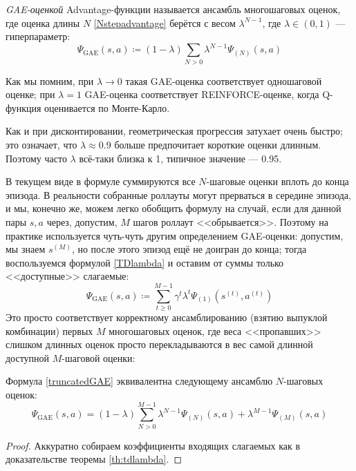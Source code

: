 \begin{definition}
\emph{GAE-оценкой} Advantage-функции называется ансамбль многошаговых оценок, где оценка длины $N$ \eqref{Nstepadvantage} берётся с весом $\lambda^{N-1}$, где $\lambda \in (0, 1)$ --- гиперпараметр:
\begin{equation}\label{GAEadest}
\Psi_{\mathrm{GAE}}(s, a) \coloneqq (1 - \lambda) \sum_{N > 0} \lambda^{N-1} \Psi_{(N)}(s, a)
\end{equation}
\end{definition}

Как мы помним, при $\lambda \to 0$ такая GAE-оценка соответствует одношаговой оценке; при $\lambda = 1$ GAE-оценка соответствует REINFORCE-оценке, когда Q-функция оценивается по Монте-Карло.

\begin{remark}
Как и при дисконтировании, геометрическая прогрессия затухает очень быстро; это означает, что $\lambda \approx 0.9$ больше предпочитает короткие оценки длинным. Поэтому часто $\lambda$ всё-таки близка к 1, типичное значение --- 0.95.
\end{remark}

В текущем виде в формуле суммируются все $N$-шаговые оценки вплоть до конца эпизода. В реальности собранные роллауты могут прерваться в середине эпизода, и мы, конечно же, можем легко обобщить формулу на случай, если для данной пары $s, a$ через, допустим, $M$ шагов роллаут <<обрывается>>. Поэтому на практике используется чуть-чуть другим определением GAE-оценки: допустим, мы знаем $s^{(M)}$, но после этого эпизод ещё не доигран до конца; тогда воспользуемся формулой \eqref{TDlambda} и оставим от суммы только <<доступные>> слагаемые:
\begin{equation}\label{truncatedGAE}
\Psi_{\mathrm{GAE}}(s, a) \coloneqq \sum_{t \ge 0}^{M - 1} \gamma^t \lambda^t \Psi_{(1)}(s^{(t)}, a^{(t)})
\end{equation}
Это просто соответствует корректному ансамблированию (взятию выпуклой комбинации) первых $M$ многошаговых оценок, где веса <<пропавших>> слишком длинных оценок просто перекладываются в вес самой длинной доступной $M$-шаговой оценки:

\begin{proposition}
Формула \eqref{truncatedGAE} эквивалентна следующему ансамблю $N$-шаговых оценок:
$$\Psi_{\mathrm{GAE}}(s, a) = (1 - \lambda) \sum_{N > 0}^{M-1} \lambda^{N-1} \Psi_{(N)}(s, a) + \lambda^{M-1} \Psi_{(M)}(s, a)$$
\begin{proof}
Аккуратно собираем коэффициенты входящих слагаемых как в доказательстве теоремы \ref{th:tdlambda}.
\end{proof}
\end{proposition}

